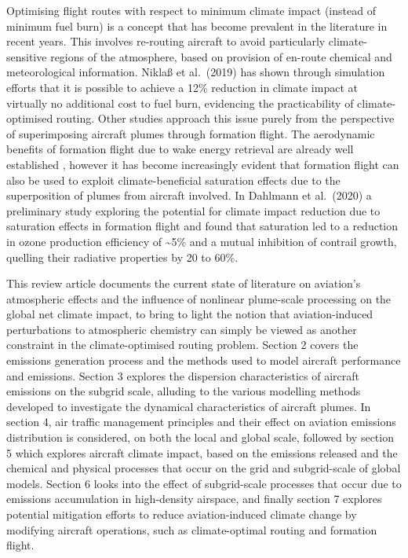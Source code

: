 Optimising flight routes with respect to minimum climate impact (instead of minimum fuel burn) is a concept that has become prevalent in the literature in recent years. This involves re-routing aircraft to avoid particularly climate-sensitive regions of the atmosphere, based on provision of en-route chemical and meteorological information. Nikla{\ss} et al.\ (2019) \cite{Niklass2019} has shown through simulation efforts that it is possible to achieve a 12\% reduction in climate impact at virtually no additional cost to fuel burn, evidencing the practicability of climate-optimised routing. Other studies approach this issue purely from the perspective of superimposing aircraft plumes through formation flight. The aerodynamic benefits of formation flight due to wake energy retrieval are already well established \cite{Bangash2004, Kent2020}, however it has become increasingly evident that formation flight can also be used to exploit climate-beneficial saturation effects due to the superposition of plumes from aircraft involved. In Dahlmann et al.\ (2020) \cite{Dahlmann2020} a preliminary study exploring the potential for climate impact reduction due to saturation effects in formation flight and found that  saturation led to a reduction in ozone production efficiency of \textasciitilde5\% and a mutual inhibition of contrail growth, quelling their radiative properties by 20 to 60\%. 

This review article documents the current state of literature on aviation's atmospheric effects and the influence of nonlinear plume-scale processing on the global net climate impact, to bring to light the notion that aviation-induced perturbations to atmospheric chemistry can simply be viewed as another constraint in the climate-optimised routing problem. Section 2 covers the emissions generation process and the methods used to model aircraft performance and emissions. Section 3 explores the dispersion characteristics of aircraft emissions on the subgrid scale, alluding to the various modelling methods developed to investigate the dynamical characteristics of aircraft plumes. In section 4, air traffic management principles and their effect on aviation emissions distribution is considered, on both the local and global scale, followed by section 5 which explores aircraft climate impact, based on the emissions released and the chemical and physical processes that occur on the grid and subgrid-scale of global models. Section 6 looks into the effect of subgrid-scale processes that occur due to emissions accumulation in high-density airspace, and finally section 7 explores potential mitigation efforts to reduce aviation-induced climate change by modifying aircraft operations, such as climate-optimal routing and formation flight.


